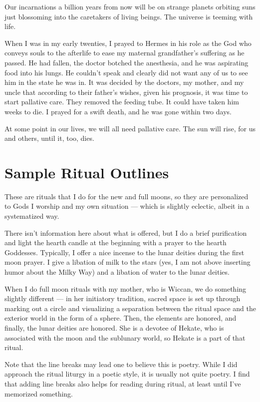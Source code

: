 \documentclass[
]{book}
\begin{document}
Our incarnations a billion years from now will be on strange planets orbiting suns just blossoming into the caretakers of living beings. The universe is teeming with life.

When I was in my early twenties, I prayed to Hermes in his role as the God who conveys souls to the afterlife to ease my maternal grandfather's suffering as he passed. He had fallen, the doctor botched the anesthesia, and he was aspirating food into his lungs. He couldn't speak and clearly did not want any of us to see him in the state he was in. It was decided by the doctors, my mother, and my uncle that according to their father's wishes, given his prognosis, it was time to start pallative care. They removed the feeding tube. It could have taken him weeks to die. I prayed for a swift death, and he was gone within two days.

At some point in our lives, we will all need pallative care. The sun will rise, for us and others, until it, too, dies.

\hypertarget{sample-ritual-outlines}{%
\section{Sample Ritual Outlines}\label{sample-ritual-outlines}}

These are rituals that I do for the new and full moons, so they are personalized to Gods I worship and my own situation --- which is slightly eclectic, albeit in a systematized way.

There isn't information here about what is offered, but I do a brief purification and light the hearth candle at the beginning with a prayer to the hearth Goddesses. Typically, I offer a nice incense to the lunar deities during the first moon prayer. I give a libation of milk to the stars (yes, I am not above inserting humor about the Milky Way) and a libation of water to the lunar deities.

When I do full moon rituals with my mother, who is Wiccan, we do something slightly different --- in her initiatory tradition, sacred space is set up through marking out a circle and visualizing a separation between the ritual space and the exterior world in the form of a sphere. Then, the elements are honored, and finally, the lunar deities are honored. She is a devotee of Hekate, who is associated with the moon and the sublunary world, so Hekate is a part of that ritual.

Note that the line breaks may lead one to believe this is poetry. While I did approach the ritual liturgy in a poetic style, it is usually not quite poetry. I find that adding line breaks also helps for reading during ritual, at least until I've memorized something.
\end{document}
